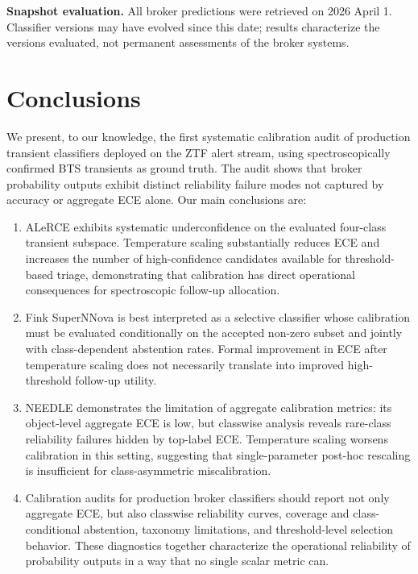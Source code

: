 \documentclass[twocolumn]{aastex631}
\begin{document}
\textbf{Snapshot evaluation.} All broker predictions were
retrieved on 2026 April 1. Classifier versions may have evolved
since this date; results characterize the versions evaluated,
not permanent assessments of the broker systems.


\section{Conclusions}\label{sec:conclusions}

We present, to our knowledge, the first systematic calibration
audit of production transient classifiers deployed on the ZTF
alert stream, using spectroscopically confirmed BTS transients
as ground truth. The audit shows that broker probability outputs
exhibit distinct reliability failure modes not captured by
accuracy or aggregate ECE alone. Our main conclusions are:

\begin{enumerate}

\item ALeRCE exhibits systematic underconfidence on the evaluated
four-class transient subspace. Temperature scaling substantially
reduces ECE and increases the number of high-confidence candidates
available for threshold-based triage, demonstrating that
calibration has direct operational consequences for spectroscopic
follow-up allocation.

\item Fink SuperNNova is best interpreted as a selective
classifier whose calibration must be evaluated conditionally on
the accepted non-zero subset and jointly with class-dependent
abstention rates. Formal improvement in ECE after temperature
scaling does not necessarily translate into improved
high-threshold follow-up utility.

\item NEEDLE demonstrates the limitation of aggregate calibration
metrics: its object-level aggregate ECE is low, but classwise
analysis reveals rare-class reliability failures hidden by
top-label ECE. Temperature scaling worsens calibration in this
setting, suggesting that single-parameter post-hoc rescaling is
insufficient for class-asymmetric miscalibration.

\item Calibration audits for production broker classifiers should
report not only aggregate ECE, but also classwise reliability
curves, coverage and class-conditional abstention, taxonomy
limitations, and threshold-level selection behavior. These
diagnostics together characterize the operational reliability of
probability outputs in a way that no single scalar metric can.

\end{enumerate}
\end{document}
